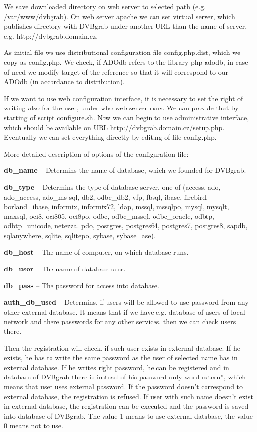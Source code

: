 We save downloaded directory on web server to selected path (e.g. /var/www/dvbgrab). On web server apache we can set virtual server, which publishes directory with DVBgrab under another URL than the name of server, e.g. http://dvbgrab.domain.cz.

As initial file we use distributional configuration file config.php.dist, which we copy as config.php.
We check, if ADOdb refers to the library php-adodb, in case of need we modify target of the reference so that it will correspond to our ADOdb (in accordance to distribution).

If we want to use web configuration interface, it is necessary to set the right of writing also for the user, under who web server runs. We can provide that by starting of script configure.sh. Now we can begin to use administrative interface, which should be available on URL http://dvbgrab.domain.cz/setup.php. Eventually we can set everything directly by editing of file config.php.

More detailed description of options of the configuration file:
\bitem
\item\textbf{db\_name} -- Determins the name of database, which we founded for DVBgrab.
\item\textbf{db\_type} -- Determins the type of database server, one of (access, ado, ado\_access, ado\_ms-sql, db2, odbc\_db2, vfp, fbsql, ibase, firebird, borland\_ibase, informix, informix72, ldap, mssql, mssqlpo, mysql, mysqlt, maxsql, oci8, oci805, oci8po, odbc, odbc\_mssql, odbc\_oracle, odbtp, odbtp\_unicode, netezza. pdo, postgres, postgres64, postgres7, postgres8, sapdb, sqlanywhere, sqlite, sqlitepo, sybase, sybase\_ase).
\item\textbf{db\_host} -- The name of computer, on which database runs.
\item\textbf{db\_user} -- The name of database user.
\item\textbf{db\_pass} -- The password for access into database.
\item\textbf{auth\_db\_used} -- Determins, if users will be allowed to use password from any other external database. It means that if we have e.g. database of users of local network and there passwords for any other services, then we can check users there.

Then the registration will check, if such user exists in external database. If he exists, he has to write the same password as the user of selected name has in external database. If he writes right password, he can be registered and in database of DVBgrab there is instead of his password only word \quotedblbase extern'', which means that user uses external password. If the password doesn't correspond to external database, the registration is refused. If user with such name doesn't exist in external database, the registration can be executed and the password is saved into database of DVBgrab. The value 1 means to use external database, the value 0 means not to use.

